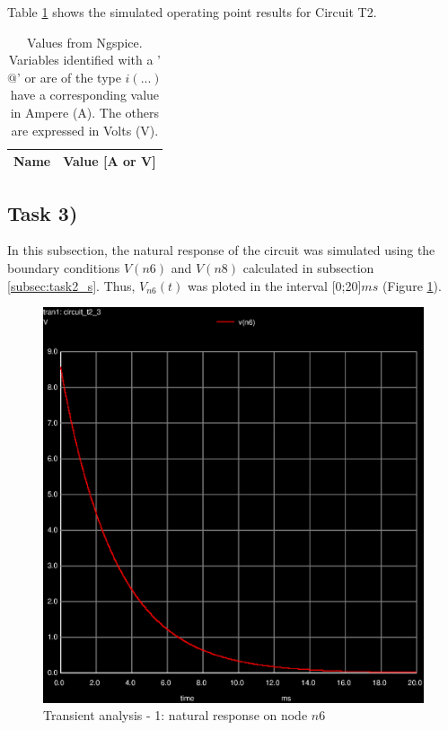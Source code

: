 Table \ref{tab:op2} shows the simulated operating point results for Circuit T2.

\begin{table}[ht]
	\centering
	\begin{tabular}{|l|r|}
		\hline    
		{\bf Name} & {\bf Value [A or V]} \\ \hline
    		
	\end{tabular}
	
	\caption{Values from Ngspice. Variables identified with a '$@$' or are of the type
	$i(...)$ have a corresponding value in Ampere (A). The others are expressed in Volts (V).}
    
\label{tab:op2}
\end{table}


\subsection{Task 3)}
\label{subsec:task3_s}

In this subsection, the natural response of the circuit was simulated using the boundary conditions
$V(n6)$ and $V(n8)$ calculated in subsection \ref{subsec:task2_s}. Thus, $V_{n6}(t)$ was ploted in the 
interval [0;20]$ms$ (Figure \ref{fig:trans-1}).

\begin{figure}[ht]
	\centering
	\includegraphics[width=0.55\linewidth]{trans-1.eps}
	\caption{Transient analysis - 1: natural response on node $n6$}
\label{fig:trans-1}
\end{figure}


